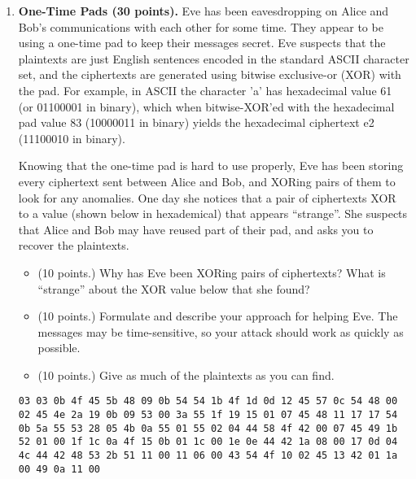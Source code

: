 \documentclass[11pt]{article}
\begin{document}
\begin{enumerate}
\item {\bf One-Time Pads (30 points).} Eve has been eavesdropping on
  Alice and Bob's communications with each other for some time. They
  appear to be using a one-time pad to keep their messages secret. Eve
  suspects that the plaintexts are just English sentences encoded in the
  standard ASCII character set, and the ciphertexts are generated using
  bitwise exclusive-or (XOR) with the pad. For example, in ASCII the
  character 'a' has hexadecimal value 61 (or 01100001 in binary), which
  when bitwise-XOR’ed with the hexadecimal pad value 83 (10000011 in
  binary) yields the hexadecimal ciphertext e2 (11100010 in binary).

Knowing that the one-time pad is hard to use properly, Eve has been
storing every ciphertext sent between Alice and Bob, and XORing pairs of
them to look for any anomalies. One day she notices that a pair of
ciphertexts XOR to a value (shown below in hexademical) that appears
``strange''. She suspects that Alice and Bob may have reused part of their
pad, and asks you to recover the plaintexts.

\begin{itemize}
\itemsep=-1pt
\item (10 points.) Why has Eve been XORing pairs of ciphertexts? What is
  ``strange'' about the XOR value below that she found?
\item (10 points.) Formulate and describe your approach for helping
  Eve. The messages may be time-sensitive, so your attack should work as
  quickly as possible. 
\item (10 points.) Give as much of the plaintexts as you can find.
\end{itemize}

\begin{verbatim}
03 03 0b 4f 45 5b 48 09 0b 54 54 1b 4f 1d 0d 12 45 57 0c 54 48 00
02 45 4e 2a 19 0b 09 53 00 3a 55 1f 19 15 01 07 45 48 11 17 17 54
0b 5a 55 53 28 05 4b 0a 55 01 55 02 04 44 58 4f 42 00 07 45 49 1b
52 01 00 1f 1c 0a 4f 15 0b 01 1c 00 1e 0e 44 42 1a 08 00 17 0d 04
4c 44 42 48 53 2b 51 11 00 11 06 00 43 54 4f 10 02 45 13 42 01 1a
00 49 0a 11 00
\end{verbatim}


\end{enumerate}
\end{document}
